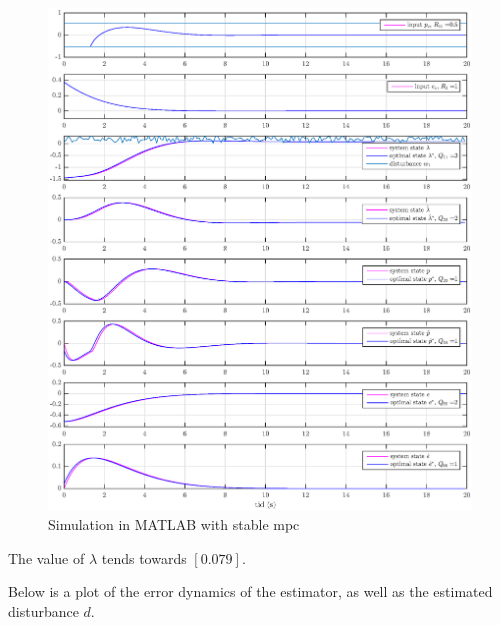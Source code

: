 \begin{figure}[h!]
    \centering
    \includegraphics[scale=0.4]{fig/heli_sim_est_stable.eps}
    \caption{Simulation in MATLAB with stable \acrshort{mpc}}
    \label{fig:my_label}
\end{figure}

The value of $\lambda$ tends towards $[0.079]$.


Below is a plot of the error dynamics of the estimator, as well as the estimated disturbance $d$. 

